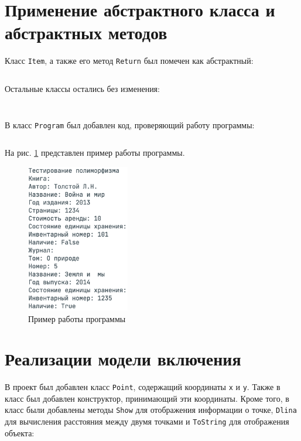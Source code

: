 \documentclass[a4paper,14pt]{extarticle}
\numberwithin{figure}{section}
\begin{document}
\section{Применение абстрактного класса и абстрактных методов}

Класс \texttt{Item}, а также его метод \texttt{Return} был помечен как абстрактный:

\inputminted{csharp}{../MyClass3/MyClass/Item.cs}

Остальные классы остались без изменения:

\inputminted{csharp}{../MyClass3/MyClass/Book.cs}

\inputminted{csharp}{../MyClass3/MyClass/Magazine.cs}

В класс \texttt{Program} был добавлен код, проверяющий работу программы:

\inputminted{csharp}{../MyClass3/MyClass/Program.cs}

На рис. \ref{fig:task-4} представлен пример работы программы.

\begin{figure}[H]
    \centering
    \includegraphics[width=0.4\textwidth]{images/task-4.png}
    \caption{Пример работы программы}
    \label{fig:task-4}
\end{figure}

\section{Реализации модели включения}

В проект был добавлен класс \texttt{Point}, содержащий координаты \texttt{x} и \texttt{y}. Также в класс был добавлен конструктор, принимающий эти координаты. Кроме того, в класс были добавлены методы \texttt{Show} для отображения информации о точке, \texttt{Dlina} для вычисления расстояния между двумя точками и \texttt{ToString} для отображения объекта:
\end{document}
